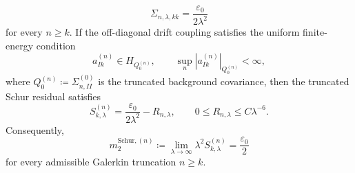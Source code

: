 \begin{proposition}
\begin{equation}
  \Sigma_{n,\lambda,kk}=\frac{\varepsilon_0}{2\lambda^2}
\end{equation}
for every $n\ge k$.  If the off-diagonal drift coupling satisfies the uniform finite-energy condition
\begin{equation}
  a_{Ik}^{(n)}\in H_{Q_0^{(n)}},\qquad \sup_n|a_{Ik}^{(n)}|_{Q_0^{(n)}}<\infty,
\end{equation}
where $Q_0^{(n)}\coloneqq\Sigma_{n,II}^{(0)}$ is the truncated background covariance, then the truncated Schur residual satisfies
\begin{equation}
  S_{k,\lambda}^{(n)}=\frac{\varepsilon_0}{2\lambda^2}-R_{n,\lambda},
  \qquad 0\le R_{n,\lambda}\le C\lambda^{-6}.
\end{equation}
Consequently,
\begin{equation}
  m_2^{\mathrm{Schur},(n)}\coloneqq\lim_{\lambda\to\infty}\lambda^2S_{k,\lambda}^{(n)}=\frac{\varepsilon_0}{2}
\end{equation}
for every admissible Galerkin truncation $n\ge k$.
\end{proposition}

